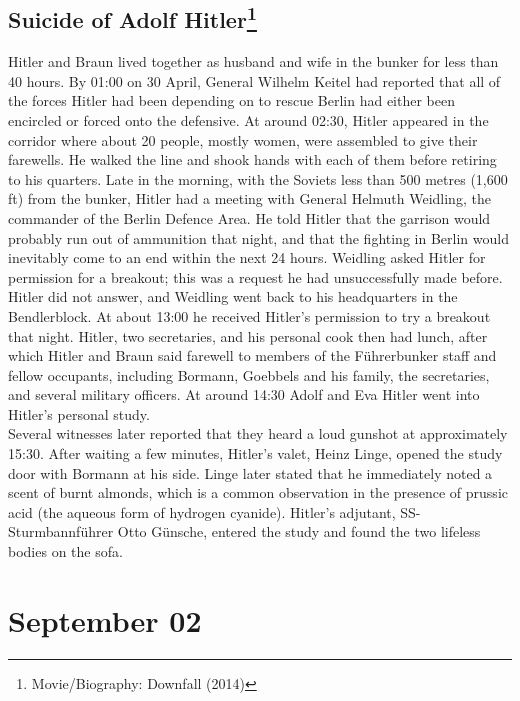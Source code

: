 \documentclass[11pt]{report}
\begin{document}
\subsection{Suicide of Adolf Hitler\protect\footnote{Movie/Biography: Downfall (2014)}}
Hitler and Braun lived together as husband and wife in the bunker for less than 40 hours. By 01:00 on 30 April, General Wilhelm Keitel had reported that all of the forces Hitler had been depending on to rescue Berlin had either been encircled or forced onto the defensive. At around 02:30, Hitler appeared in the corridor where about 20 people, mostly women, were assembled to give their farewells. He walked the line and shook hands with each of them before retiring to his quarters. Late in the morning, with the Soviets less than 500 metres (1,600 ft) from the bunker, Hitler had a meeting with General Helmuth Weidling, the commander of the Berlin Defence Area. He told Hitler that the garrison would probably run out of ammunition that night, and that the fighting in Berlin would inevitably come to an end within the next 24 hours. Weidling asked Hitler for permission for a breakout; this was a request he had unsuccessfully made before. Hitler did not answer, and Weidling went back to his headquarters in the Bendlerblock. At about 13:00 he received Hitler's permission to try a breakout that night. Hitler, two secretaries, and his personal cook then had lunch, after which Hitler and Braun said farewell to members of the Führerbunker staff and fellow occupants, including Bormann, Goebbels and his family, the secretaries, and several military officers. At around 14:30 Adolf and Eva Hitler went into Hitler's personal study.\\
\indent Several witnesses later reported that they heard a loud gunshot at approximately 15:30. After waiting a few minutes, Hitler's valet, Heinz Linge, opened the study door with Bormann at his side. Linge later stated that he immediately noted a scent of burnt almonds, which is a common observation in the presence of prussic acid (the aqueous form of hydrogen cyanide). Hitler's adjutant, SS-Sturmbannführer Otto Günsche, entered the study and found the two lifeless bodies on the sofa. 
\section{September 02}
\end{document}
